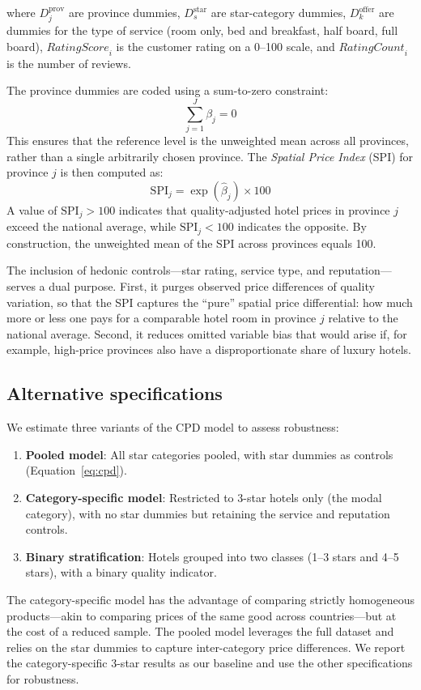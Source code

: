 \documentclass[12pt,a4paper]{article}
\begin{document}
\noindent where $D_j^{\text{prov}}$ are province dummies, $D_s^{\text{star}}$ are star-category dummies, $D_k^{\text{offer}}$ are dummies for the type of service (room only, bed and breakfast, half board, full board), $\textit{RatingScore}_i$ is the customer rating on a 0--100 scale, and $\textit{RatingCount}_i$ is the number of reviews.

The province dummies are coded using a sum-to-zero constraint:
\begin{equation}
\sum_{j=1}^{J} \beta_j = 0
\end{equation}
This ensures that the reference level is the unweighted mean across all provinces, rather than a single arbitrarily chosen province. The \textit{Spatial Price Index} (SPI) for province $j$ is then computed as:
\begin{equation}
\label{eq:spi}
\text{SPI}_j = \exp(\hat{\beta}_j) \times 100
\end{equation}
A value of $\text{SPI}_j > 100$ indicates that quality-adjusted hotel prices in province $j$ exceed the national average, while $\text{SPI}_j < 100$ indicates the opposite. By construction, the unweighted mean of the SPI across provinces equals 100.

The inclusion of hedonic controls---star rating, service type, and reputation---serves a dual purpose. First, it purges observed price differences of quality variation, so that the SPI captures the ``pure'' spatial price differential: how much more or less one pays for a comparable hotel room in province $j$ relative to the national average. Second, it reduces omitted variable bias that would arise if, for example, high-price provinces also have a disproportionate share of luxury hotels.

\subsection{Alternative specifications}

We estimate three variants of the CPD model to assess robustness:
\begin{enumerate}
    \item[(i)] \textbf{Pooled model}: All star categories pooled, with star dummies as controls (Equation~\ref{eq:cpd}).
    \item[(ii)] \textbf{Category-specific model}: Restricted to 3-star hotels only (the modal category), with no star dummies but retaining the service and reputation controls.
    \item[(iii)] \textbf{Binary stratification}: Hotels grouped into two classes (1--3 stars and 4--5 stars), with a binary quality indicator.
\end{enumerate}
The category-specific model has the advantage of comparing strictly homogeneous products---akin to comparing prices of the same good across countries---but at the cost of a reduced sample. The pooled model leverages the full dataset and relies on the star dummies to capture inter-category price differences. We report the category-specific 3-star results as our baseline and use the other specifications for robustness.
\end{document}
